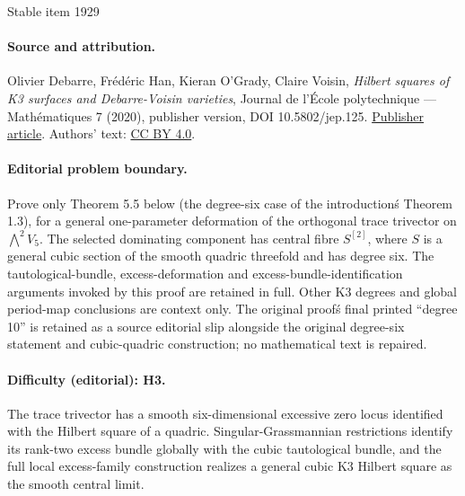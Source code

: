 \documentclass[11pt]{article}
\begin{document}
\begin{center}{\Large Stable item 1929}\end{center}
\paragraph{Source and attribution.}
Olivier Debarre, Frédéric Han, Kieran O’Grady, Claire Voisin, \emph{Hilbert squares of K3 surfaces and Debarre-Voisin varieties}, Journal de l’École polytechnique — Mathématiques 7 (2020), publisher version, DOI 10.5802/jep.125. \href{https://jep.centre-mersenne.org/articles/10.5802/jep.125/}{Publisher article}. Authors' text: \href{https://creativecommons.org/licenses/by/4.0/}{CC BY 4.0}.
\paragraph{Editorial problem boundary.}
Prove only Theorem 5.5 below (the degree-six case of the introduction\'s Theorem 1.3), for a general one-parameter deformation of the orthogonal trace trivector on \(\bigwedge^2 V_5\). The selected dominating component has central fibre \(S^{[2]}\), where \(S\) is a general cubic section of the smooth quadric threefold and has degree six. The tautological-bundle, excess-deformation and excess-bundle-identification arguments invoked by this proof are retained in full. Other K3 degrees and global period-map conclusions are context only. The original proof\'s final printed “degree 10” is retained as a source editorial slip alongside the original degree-six statement and cubic-quadric construction; no mathematical text is repaired.
\paragraph{Difficulty (editorial): H3.}
The trace trivector has a smooth six-dimensional excessive zero locus identified with the Hilbert square of a quadric. Singular-Grassmannian restrictions identify its rank-two excess bundle globally with the cubic tautological bundle, and the full local excess-family construction realizes a general cubic K3 Hilbert square as the smooth central limit.
\end{document}
